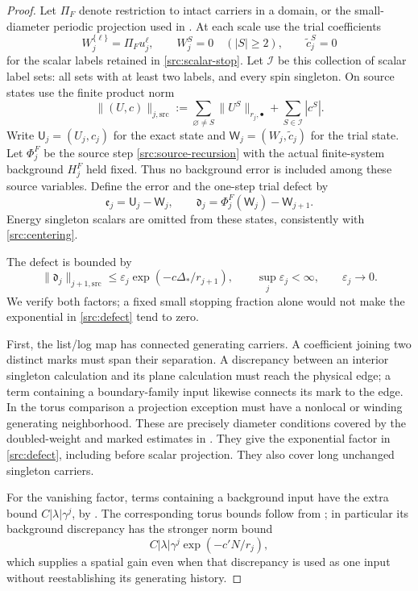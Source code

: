 \begin{proof}
Let $\Pi_F$ denote restriction to intact carriers in a domain, or the
small-diameter periodic projection used in . At each
scale use the trial coefficients
\[
 W_j^{\{\ell\}}=\Pi_F u_j^\ell,
 \qquad W_j^S=0\quad(|S|\geq2),
 \qquad \widetilde c_j^S=0
\]
for the scalar labels retained in \eqref{src:scalar-stop}. Let $\mathcal I$
be this collection of scalar label sets: all sets with at least two
labels, and every spin singleton. On source states use the finite product
norm
\[
 \|(U,c)\|_{j,\mathrm{src}}
   :=\sum_{\varnothing\ne S}\|U^S\|_{r_j,\bullet}
          +\sum_{S\in\mathcal I}|c^S|.
\]
Write $\mathsf U_j=(U_j,c_j)$ for the exact state and
$\mathsf W_j=(W_j,\widetilde c_j)$ for the trial state. Let $\Phi_j^F$
be the source step \eqref{src:source-recursion} with the actual
finite-system background $H_j^F$ held fixed. Thus no background error
is included among these source variables. Define the error and the
one-step trial defect by
\[
 \mathfrak e_j=\mathsf U_j-\mathsf W_j,
 \qquad
 \mathfrak d_j=\Phi_j^F(\mathsf W_j)-\mathsf W_{j+1}.
\]
Energy singleton scalars are omitted from these states, consistently
with \eqref{src:centering}.

The defect is bounded by
\begin{equation}
 \|\mathfrak d_j\|_{j+1,\mathrm{src}}
 \leq\varepsilon_j\exp(-c\Delta_*/r_{j+1}),
 \qquad
 \sup_j\varepsilon_j<\infty,
 \qquad \varepsilon_j\longrightarrow0.
 \label{src:defect}
\end{equation}
We verify both factors; a fixed small stopping fraction alone would not
make the exponential in \eqref{src:defect} tend to zero.

First, the list/log map has connected generating carriers. A coefficient
joining two distinct marks must span their separation. A discrepancy
between an interior singleton calculation and its plane calculation
must reach the physical edge; a term containing a boundary-family input
likewise connects its mark to the edge. In the torus comparison a
projection exception must have a nonlocal or winding generating
neighborhood. These are precisely diameter conditions covered by the
doubled-weight and marked estimates in . They give the
exponential factor in \eqref{src:defect}, including before scalar
projection. They also cover long unchanged singleton carriers.

For the vanishing factor, terms containing a background input have the
extra bound $C|\lambda|\gamma^j$, by .
The corresponding torus bounds follow from ; in
particular its background discrepancy has the stronger norm bound
\[
 C|\lambda|\gamma^j\exp(-c'N/r_j),
\]
which supplies a spatial gain even when that discrepancy is used as one
input without reestablishing its generating history.


\end{proof}
